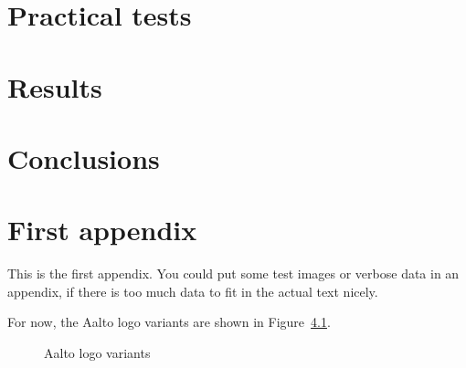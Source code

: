 \documentclass[12pt,a4paper,oneside,pdftex]{report}
\begin{document}


% 

\chapter{Practical tests}
\label{chapter:Practical tests}



% 

\chapter{Results}
\label{chapter:results}



% 

\chapter{Conclusions}
\label{chapter:conclusions}

% 



\appendix
% 

\chapter{First appendix}
\label{chapter:first-appendix}

This is the first appendix. You could put some test images or verbose data in an
appendix, if there is too much data to fit in the actual text nicely.

For now, the Aalto logo variants are shown in Figure~\ref{fig:aaltologo}.

\begin{figure}
\begin{center}
\caption{Aalto logo variants}
\label{fig:aaltologo}
\end{center}
\end{figure}


\end{document}
